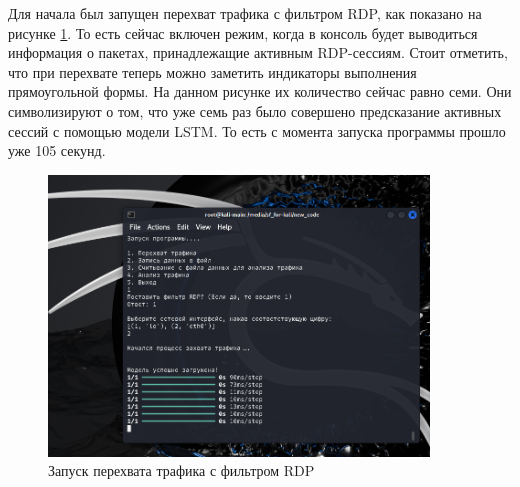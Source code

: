 \documentclass[bachelor, och, coursework]{SCWorks}
\begin{document}
Для начала был запущен перехват трафика с фильтром RDP, как показано на рисунке \ref{main1}. То есть сейчас включен режим, когда в консоль 
будет выводиться информация о пакетах, принадлежащие активным RDP-сессиям. Стоит отметить, что при перехвате теперь можно заметить индикаторы выполнения прямоугольной
формы. На данном рисунке их количество сейчас равно семи. Они символизируют о том, что уже семь раз было совершено предсказание активных 
сессий с помощью модели LSTM. То есть с момента запуска программы прошло уже 105 секунд.

\begin{figure}[H]
  \centering
  \includegraphics[width=0.9\textwidth]{pics/main-view.png}
  \caption{Запуск перехвата трафика с фильтром RDP}
  \label{main1}
\end{figure}





\end{document}
